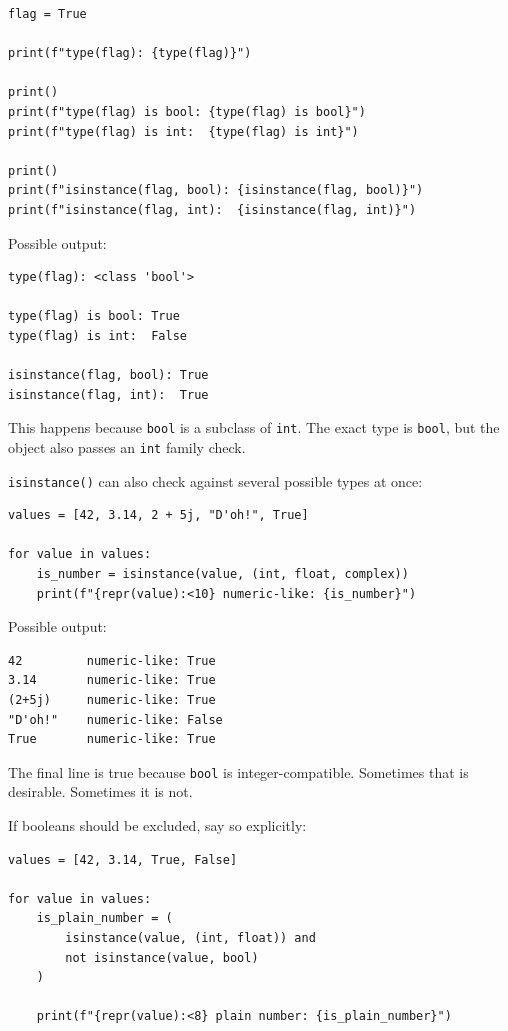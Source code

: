 \begin{verbatim}
flag = True

print(f"type(flag): {type(flag)}")

print()
print(f"type(flag) is bool: {type(flag) is bool}")
print(f"type(flag) is int:  {type(flag) is int}")

print()
print(f"isinstance(flag, bool): {isinstance(flag, bool)}")
print(f"isinstance(flag, int):  {isinstance(flag, int)}")
\end{verbatim}

Possible output:

\begin{verbatim}
type(flag): <class 'bool'>

type(flag) is bool: True
type(flag) is int:  False

isinstance(flag, bool): True
isinstance(flag, int):  True
\end{verbatim}

This happens because \texttt{bool} is a subclass of \texttt{int}. The exact type is \texttt{bool}, but the object also passes an \texttt{int} family check.

\texttt{isinstance()} can also check against several possible types at once:

\begin{verbatim}
values = [42, 3.14, 2 + 5j, "D'oh!", True]

for value in values:
    is_number = isinstance(value, (int, float, complex))
    print(f"{repr(value):<10} numeric-like: {is_number}")
\end{verbatim}

Possible output:

\begin{verbatim}
42         numeric-like: True
3.14       numeric-like: True
(2+5j)     numeric-like: True
"D'oh!"    numeric-like: False
True       numeric-like: True
\end{verbatim}

The final line is true because \texttt{bool} is integer-compatible. Sometimes that is desirable. Sometimes it is not.

If booleans should be excluded, say so explicitly:

\begin{verbatim}
values = [42, 3.14, True, False]

for value in values:
    is_plain_number = (
        isinstance(value, (int, float)) and
        not isinstance(value, bool)
    )

    print(f"{repr(value):<8} plain number: {is_plain_number}")
\end{verbatim}

